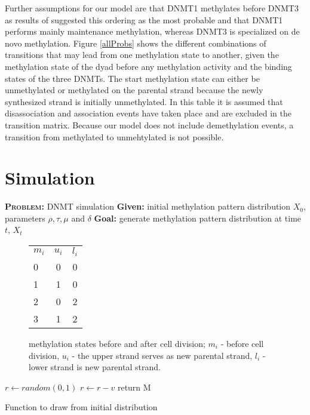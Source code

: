 Further assumptions for our model are that DNMT1 methylates before DNMT3 as results of \cite{Lueck} suggested this ordering as the most probable and that DNMT1 performs mainly maintenance methylation, whereas DNMT3 is specialized on de novo methylation. Figure \ref{allProbs} shows the different combinations of transitions that may lead from one methylation state to another, given the methylation state of the dyad before any methylation activity and the binding states of the three \acp{DNMT}. The start methylation state can either be unmethylated or methylated on the parental strand because the newly synthesized strand is initially unmethylated. In this table it is assumed that disassociation and association events have taken place and are excluded in the transition matrix. Because our model does not include demethylation events, a transition from methylated to unmehtylated is not possible.\\

\section{Simulation}
\label{sim}
\textbf{\textsc{Problem:}} \ac{DNMT} simulation\newline
\textbf{Given:} initial methylation pattern distribution $X_0$, parameters $\rho, \tau, \mu$ and $\delta$\newline
\textbf{Goal:} generate methylation pattern distribution at time $t$, $X_t$\\

\begin{figure}[h]
\begin{center}
\begin{tabularx}{\textwidth}{l|c|c}
\textbf{$m_i$}&	\textbf{$u_i$}&	\textbf{$l_i$}\\
0&	0&	0\\
1&	1&	0\\
2&	0&	2\\
3&	1&	2\\
\end{tabularx}
\end{center}
\label{celldiv}
\caption{methylation states before and after cell division; $m_i$ - before cell division, $u_i$ - the upper strand serves as new parental strand, $l_i$ - lower strand is new parental strand.}
\end{figure}

\begin{algorithm}
\begin{algorithmic}
\State $r \gets random(0,1)$
		\State $r \gets r - v$
	\Else
		\State return M
	\EndIf
\EndFor
\EndProcedure
\end{algorithmic}
\caption{\label{initialDistri} Function to draw from initial distribution}
\end{algorithm}

